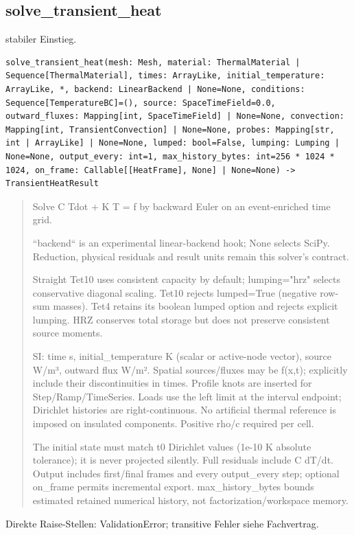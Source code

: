 \subsection{solve\_transient\_heat}
stabiler Einstieg.
\begin{lstlisting}
solve_transient_heat(mesh: Mesh, material: ThermalMaterial | Sequence[ThermalMaterial], times: ArrayLike, initial_temperature: ArrayLike, *, backend: LinearBackend | None=None, conditions: Sequence[TemperatureBC]=(), source: SpaceTimeField=0.0, outward_fluxes: Mapping[int, SpaceTimeField] | None=None, convection: Mapping[int, TransientConvection] | None=None, probes: Mapping[str, int | ArrayLike] | None=None, lumped: bool=False, lumping: Lumping | None=None, output_every: int=1, max_history_bytes: int=256 * 1024 * 1024, on_frame: Callable[[HeatFrame], None] | None=None) -> TransientHeatResult
\end{lstlisting}
\begin{quote}
Solve C Tdot + K T = f by backward Euler on an event-enriched time grid.\par ``backend`` is an experimental linear-backend hook; None selects SciPy. Reduction, physical residuals and result units remain this solver's contract.\par Straight Tet10 uses consistent capacity by default; lumping="hrz" selects conservative diagonal scaling. Tet10 rejects lumped=True (negative row-sum masses). Tet4 retains its boolean lumped option and rejects explicit lumping. HRZ conserves total storage but does not preserve consistent source moments.\par SI: time s, initial\_temperature K (scalar or active-node vector), source W/m³, outward flux W/m². Spatial sources/fluxes may be f(x,t); explicitly include their discontinuities in times. Profile knots are inserted for Step/Ramp/TimeSeries. Loads use the left limit at the interval endpoint; Dirichlet histories are right-continuous. No artificial thermal reference is imposed on insulated components. Positive rho/c required per cell.\par The initial state must match t0 Dirichlet values (1e-10 K absolute tolerance); it is never projected silently. Full residuals include C dT/dt. Output includes first/final frames and every output\_every step; optional on\_frame permits incremental export. max\_history\_bytes bounds estimated retained numerical history, not factorization/workspace memory.
\end{quote}
Direkte Raise-Stellen: ValidationError; transitive Fehler siehe Fachvertrag.
